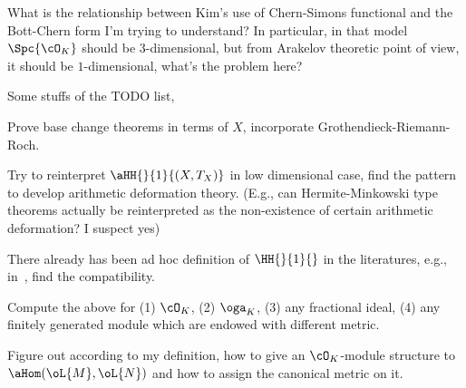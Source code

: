 \documentclass[a4paper, twoside]{article}
\begin{document}
 What is the relationship between Kim's use of Chern-Simons functional and the Bott-Chern form I'm trying to understand? In particular, in that model $\Spc{\cO_{K}}$ should be $3$-dimensional, but from Arakelov theoretic point of view, it should be $1$-dimensional, what's the problem here?

\begin{rmk}
	Some stuffs of the TODO list,
	\begin{enr}
		\item Prove base change theorems in terms of $X$, incorporate Grothendieck-Riemann-Roch.
		\item Try to reinterpret $\aHH{}{1}{(X,T_{X})}$ in low dimensional case, find the pattern to develop arithmetic deformation theory. (E.g., can Hermite-Minkowski type theorems actually be reinterpreted as the non-existence of certain arithmetic deformation? I suspect yes)
		\item There already has been ad hoc definition of $\HH{}{1}{}$ in the literatures, e.g., in~\cite{Yuan2008Big,GS1991Lattice}, find the compatibility.
		\item Compute the above for (1) $\cO_{K}$, (2) $\oga_{K}$, (3) any fractional ideal, (4) any finitely generated module which are endowed with different metric.
		\item Figure out according to my definition, how to give an $\cO_{K}$-module structure to $\aHom(\oL{M},\oL{N})$ and how to assign the canonical metric on it.
	\end{enr}
\end{rmk}





\printref
\end{document}

